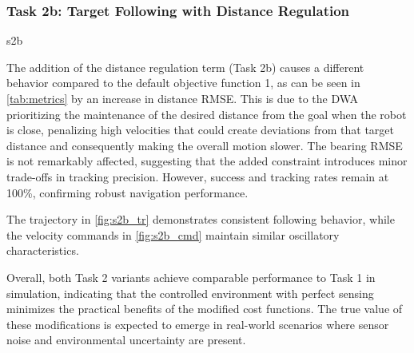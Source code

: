 \subsubsection{Task 2b: Target Following with Distance Regulation}

{s2b}

The addition of the distance regulation term (Task 2b) causes a different behavior compared to the default objective function 1, as can be seen in \autoref{tab:metrics} by an increase in distance RMSE. This is due to the DWA prioritizing the maintenance of the desired distance from the goal when the robot is close, penalizing high velocities that could create deviations from that target distance and consequently making the overall motion slower.
The bearing RMSE is not remarkably affected, suggesting that the added constraint introduces minor trade-offs in tracking precision. However, success and tracking rates remain at 100\%, confirming robust navigation performance.



The trajectory in \autoref{fig:s2b_tr} demonstrates consistent following behavior, while the velocity commands in \autoref{fig:s2b_cmd} maintain similar oscillatory characteristics. 

Overall, both Task 2 variants achieve comparable performance to Task 1 in simulation, indicating that the controlled environment with perfect sensing minimizes the practical benefits of the modified cost functions. The true value of these modifications is expected to emerge in real-world scenarios where sensor noise and environmental uncertainty are present.
